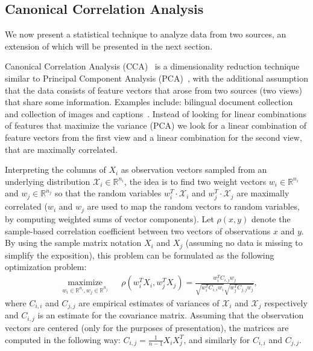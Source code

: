 \documentclass[twoside,11pt]{article}
\newcommand{\RR}{\mathbb{R}}
\begin{document}
\subsection{Canonical Correlation Analysis}\label{sec:CCA}
 We now present a statistical technique to analyze data from two sources, an extension of which will be presented in the next section.
\begin{sloppypar}
 Canonical Correlation Analysis (CCA)~\cite{Hotelling} is a dimensionality reduction technique similar to Principal Component Analysis (PCA)~\cite{Pearson1901On}, with the additional assumption that the data consists of feature vectors that arose from two sources (two views) that share some information. Examples include: bilingual document collection~ and collection of images and captions~. Instead of looking for linear combinations of features that maximize the variance (PCA) we look for a linear combination of feature vectors from the first view and a linear combination for the second view, that are maximally correlated.
\end{sloppypar}
Interpreting the columns of $X_i$ as observation vectors sampled from an underlying distribution $\mathcal{X}_i \in \RR^{n_i}$, the idea is to find two weight vectors $w_i \in \RR^{n_i}$ and $w_j \in \RR^{n_j}$ so that the random variables $w_i^T \cdot \mathcal{X}_i$ and $w_j^T \cdot \mathcal{X}_j$ are maximally correlated ($w_i$ and $w_j$ are used to map the random vectors to random variables, by computing weighted sums of vector components). Let $\rho(x,y)$ denote the sample-based correlation coefficient between two vectors of observations $x$ and $y$. By using the sample matrix notation $X_i$ and $X_j$ (assuming no data is missing to simplify the exposition), this problem can be formulated as the following optimization problem:
\begin{equation*}
\begin{aligned}
& \underset{w_i \in \RR^{n_i}, w_j \in \RR^{n_j}}{\text{maximize}}
& & \rho(w_i^T X_i , w_j^T X_j) = \frac{w_i^T C_{i,j} w_j}{\sqrt{w_i^T C_{i,i} w_i} \sqrt{w_j^T C_{j,j} w_j}},
\end{aligned}
\end{equation*}
where $C_{i,i}$ and $C_{j,j}$ are empirical estimates of variances of $\mathcal{X}_i$ and $\mathcal{X}_j$ respectively and $C_{i,j}$ is an estimate for the covariance matrix. Assuming that the observation vectors are centered (only for the purposes of presentation), the matrices are computed in the following way: $C_{i,j} = \frac{1}{n-1}X_i X_j^T$, and similarly for $C_{i,i}$ and $C_{j,j}$.
\end{document}
